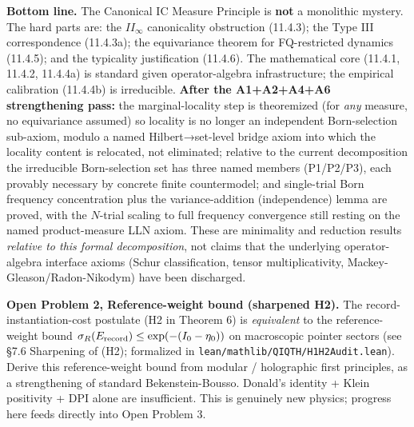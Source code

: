 \documentclass[11pt,a4paper]{article}
\begin{document}
\textbf{Bottom line.} The Canonical IC Measure Principle is \textbf{not} a monolithic mystery. The hard parts are: the $II_\infty$ canonicality obstruction (11.4.3); the Type III correspondence (11.4.3a); the equivariance theorem for FQ-restricted dynamics (11.4.5); and the typicality justification (11.4.6). The mathematical core (11.4.1, 11.4.2, 11.4.4a) is standard given operator-algebra infrastructure; the empirical calibration (11.4.4b) is irreducible. \textbf{After the A1+A2+A4+A6 strengthening pass:} the marginal-locality step is theoremized (for \emph{any} measure, no equivariance assumed) so locality is no longer an independent Born-selection sub-axiom, modulo a named Hilbert→set-level bridge axiom into which the locality content is relocated, not eliminated; relative to the current decomposition the irreducible Born-selection set has three named members (P1/P2/P3), each provably necessary by concrete finite countermodel; and single-trial Born frequency concentration plus the variance-addition (independence) lemma are proved, with the $N$-trial scaling to full frequency convergence still resting on the named product-measure LLN axiom. These are minimality and reduction results \emph{relative to this formal decomposition}, not claims that the underlying operator-algebra interface axioms (Schur classification, tensor multiplicativity, Mackey-Gleason/Radon-Nikodym) have been discharged.

\textbf{Open Problem 2, Reference-weight bound (sharpened H2).}
The record-instantiation-cost postulate (H2 in Theorem 6) is \emph{equivalent} to the reference-weight bound $\sigma_R(E_{\rm record}) \le \exp(-(I_0 - \eta_0))$ on macroscopic pointer sectors (see §7.6 Sharpening of (H2); formalized in \texttt{lean/mathlib/QIQTH/H1H2Audit.lean}). Derive this reference-weight bound from modular / holographic first principles, as a strengthening of standard Bekenstein-Bousso. Donald's identity + Klein positivity + DPI alone are insufficient. This is genuinely new physics; progress here feeds directly into Open Problem 3.
\end{document}
